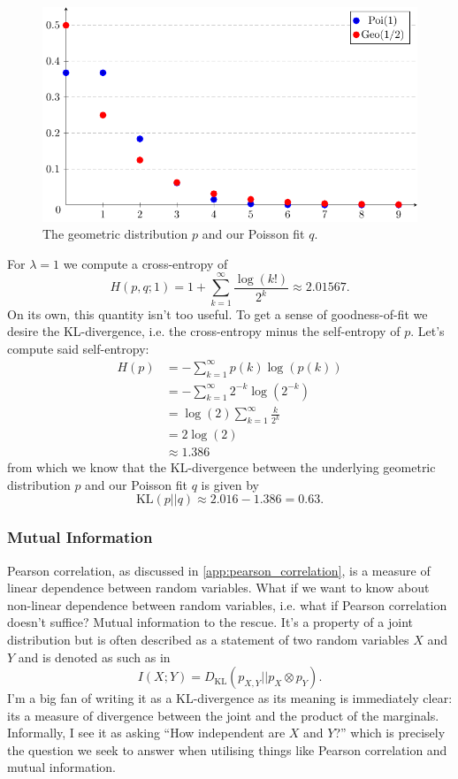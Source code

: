 \documentclass[11pt]{article}
\begin{document}
\begin{appendices}
\begin{figure}[t]
    \centering
    \includegraphics[width=\columnwidth]{./figures/appendix/poi_geo_plot.pdf}
    \caption{The geometric distribution $p$ and our Poisson fit $q$.}
    \label{fig:poi_geo_plot}
\end{figure}

For $\lambda=1$ we compute a cross-entropy of
$$
H(p,q;1)
=
1+\sum_{k=1}^{\infty}\frac{\log(k!)}{2^k}
\approx
2.01567.
$$
On its own, this quantity isn't too useful. To get a sense of goodness-of-fit we desire the KL-divergence, i.e. the cross-entropy minus the self-entropy of $p$. Let's compute said self-entropy:
\begin{align*}
    H(p)
    &=
    -\sum_{k=1}^{\infty}p(k)\log(p(k))\\
    &=
    -\sum_{k=1}^{\infty}2^{-k}\log(2^{-k})\\
    &=
    \log(2)\sum_{k=1}^{\infty}\frac{k}{2^k}\\
    &=
    2\log(2)\\
    &\approx
    1.386
\end{align*}
from which we know that the KL-divergence between the underlying geometric distribution $p$ and our Poisson fit $q$ is given by
$$
\text{KL}(p||q)
\approx
2.016-1.386
=
0.63.
$$

\subsubsection{Mutual Information}
Pearson correlation, as discussed in \autoref{app:pearson_correlation}, is a measure of linear dependence between random variables. What if we want to know about non-linear dependence between random variables, i.e. what if Pearson correlation doesn't suffice? Mutual information to the rescue. It's a property of a joint distribution but is often described as a statement of two random variables $X$ and $Y$ and is denoted as such as in
$$
I(X;Y)
=
D_{\text{KL}}(p_{X,Y}||p_X\otimes p_Y).
$$
I'm a big fan of writing it as a KL-divergence as its meaning is immediately clear: its a measure of divergence between the joint and the product of the marginals. Informally, I see it as asking ``How independent are $X$ and $Y$?'' which is precisely the question we seek to answer when utilising things like Pearson correlation and mutual information.


\end{appendices}
\end{document}
